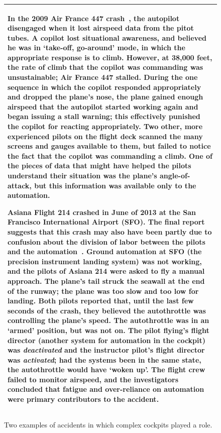 \documentclass[journal]{IEEEtran}
\begin{document}
\begin{figure}[!t]
\small
\begin{tabular}{|p{.95\linewidth}|}\hline
In the 2009 Air France 447 crash~\cite{AirFranceFinal2012}, the autopilot disengaged when it lost airspeed data from the pitot tubes.  
A copilot lost situational awareness, and believed he was in `take-off, go-around' mode, in which the appropriate response is to climb.  
However, at 38,000 feet, the rate of climb that the copilot was commanding was unsustainable; Air France 447 stalled.
During the one sequence in which the copilot responded appropriately and dropped the plane's nose, the plane gained enough airspeed that the autopilot started working again and began issuing a stall warning; this effectively punished the copilot for reacting appropriately.  
Two other, more experienced pilots on the flight deck scanned the many screens and gauges available to them, but failed to notice the fact that the copilot was commanding a climb.  
One of the pieces of data that might have helped the pilots understand their situation was the plane's angle-of-attack, but this information was available only to the automation. 

Asiana Flight 214 crashed in June of 2013 at the San Francisco International Airport (SFO).  
The final report suggests that this crash may also have been partly due to confusion about the division of labor between the pilots and the automation~\cite{AsianaFinal2014}.  
Ground automation at SFO (the precision instrument landing system) was not working, and the pilots of Asiana 214 were asked to fly a manual approach.  
The plane's tail struck the seawall at the end of the runway; the plane was too slow and too low for landing.  
Both pilots reported that, until the last few seconds of the crash, they believed the autothrottle was controlling the plane's speed.  
The autothrottle was in an `armed' position, but was not on.  The pilot flying's flight director (another system for automation in the cockpit) was \emph{deactivated} and the instructor pilot's flight director was \emph{activated}; had the systems been in the same state, the autothrottle would have `woken up'. 
The flight crew failed to monitor airspeed, and the investigators concluded that fatigue and over-reliance on automation were primary contributors to the accident.\\\hline
\end{tabular}
\caption{Two examples of accidents in which complex cockpits played a role.}\label{fig:accident}
\end{figure}
\end{document}
